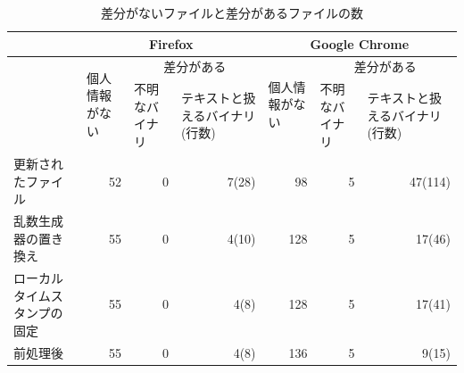 \documentclass[a4paper,twocolumn,10pt]{jarticle}
\begin{document}
\begin{table}[ht]
\caption{差分がないファイルと差分があるファイルの数}
\centering
\begin{tabular}{|p{2cm}|l|p{1.9cm}|p{1.9cm}|l|p{1.9cm}|p{1.9cm}|}
\hline
&\multicolumn{3}{|c|}{\footnotesize{Firefox}}&\multicolumn{3}{c|}{\footnotesize{Google Chrome}}\\
\hline
&\multirow{2}{1.5cm}{\footnotesize{個人情報がない}} &
\multicolumn{2}{c|}{\footnotesize{差分がある}} &\multirow{2}{1.5cm}{\footnotesize{個人情報がない}}&
\multicolumn{2}{c|}{\footnotesize{差分がある}} \\
\cline{3-4}\cline{6-7}
  & & \footnotesize{不明なバイナリ} & \footnotesize{テキストと扱えるバイナリ(行数)}& &\footnotesize{不明なバイナリ} & \footnotesize{テキストと扱えるバイナリ(行数)} \\
\hline
\footnotesize{更新されたファイル}&\multicolumn{1}{r|}{\footnotesize{52}}&\multicolumn{1}{r|}{\footnotesize{0}}&\multicolumn{1}{r|}{\footnotesize{7(28)}}  & \multicolumn{1}{r|}{\footnotesize{98}} & \multicolumn{1}{r|}{\footnotesize{5}} & \multicolumn{1}{r|}{\footnotesize{47(114)}} \\
\hline
\footnotesize{乱数生成器の置き換え}&\multicolumn{1}{r|}{\footnotesize{55}}&\multicolumn{1}{r|}{\footnotesize{0}}&\multicolumn{1}{r|}{\footnotesize{4(10)} }& \multicolumn{1}{r|}{\footnotesize{128} }& \multicolumn{1}{r|}{\footnotesize{5} }& \multicolumn{1}{r|}{\footnotesize{17(46)}} \\
\hline
\footnotesize{ローカルタイムスタンプの固定}&\multicolumn{1}{r|}{\footnotesize{55}}&\multicolumn{1}{r|}{\footnotesize{0}}&\multicolumn{1}{r|}{\footnotesize{4(8)} }&  \multicolumn{1}{r|}{\footnotesize{128} }& \multicolumn{1}{r|}{\footnotesize{5} }&\multicolumn{1}{r|}{\footnotesize{17(41) }}\\
\hline
\footnotesize{前処理後}&\multicolumn{1}{r|}{\footnotesize{55}}&\multicolumn{1}{r|}{\footnotesize{0}}&\multicolumn{1}{r|}{\footnotesize{4(8)}} &\multicolumn{1}{r|}{ \footnotesize{136} }& \multicolumn{1}{r|}{\footnotesize{5} }&\multicolumn{1}{r|}{\footnotesize{9(15)}}\\
\hline
\end{tabular}
\label{fig:result}
\end{table}
\end{document}
